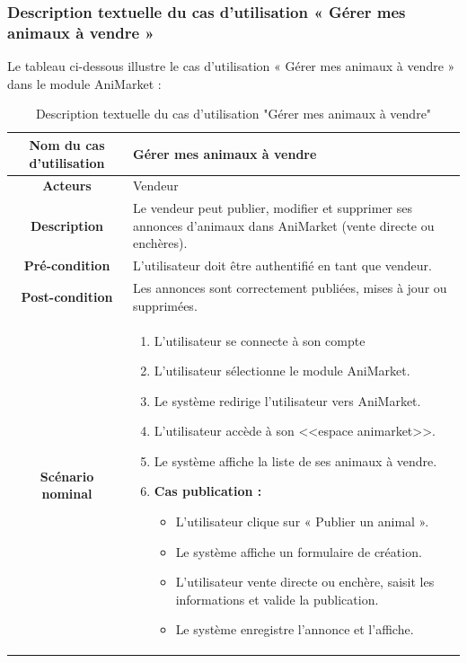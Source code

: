 \subsubsection{Description textuelle du cas d’utilisation « Gérer mes animaux à vendre »}
Le tableau ci-dessous illustre le cas d’utilisation « Gérer mes animaux à vendre » dans le module AniMarket :
\begin{longtable}{|c|p{11cm}|}
\caption{Description textuelle du cas d'utilisation "Gérer mes animaux à vendre"}
\label{tab:gerer_animaux_vente} \\
\hline
\cellcolor{coloranimarket}\textbf{Nom du cas d'utilisation } & Gérer mes animaux à vendre \\
\hline
\cellcolor{coloranimarket}\textbf{Acteurs} & Vendeur \\
\hline
\cellcolor{coloranimarket}\textbf{Description } & Le vendeur peut publier, modifier et supprimer ses annonces d’animaux dans AniMarket (vente directe ou enchères). \\
\hline
\cellcolor{coloranimarket}\textbf{Pré-condition } & L’utilisateur doit être authentifié en tant que vendeur. \\
\hline
\cellcolor{coloranimarket}\textbf{Post-condition } & Les annonces sont correctement publiées, mises à jour ou supprimées. \\
\hline

\cellcolor{coloranimarket}\textbf{Scénario nominal } &
\begin{enumerate}
\item L’utilisateur se connecte à son compte
\item L’utilisateur sélectionne le module AniMarket.
\item Le système redirige l’utilisateur vers AniMarket.
\item L’utilisateur accède à son <<espace animarket>>.
\item Le système affiche la liste de ses animaux à vendre.

\item \textbf{Cas publication :}
\begin{itemize}
\item L’utilisateur clique sur « Publier un animal ».
\item Le système affiche un formulaire de création.
\item L’utilisateur vente directe ou enchère,  saisit les informations et valide la publication.
\item Le système enregistre l’annonce et l’affiche.
\end{itemize}


\end{enumerate}
\end{longtable}
